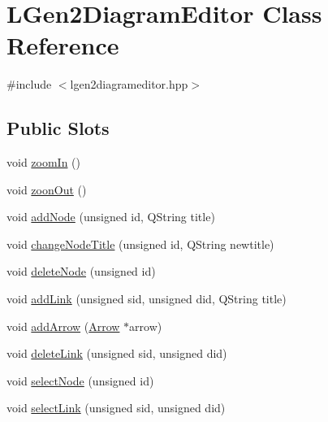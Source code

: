 \hypertarget{class_l_gen2_diagram_editor}{
\section{LGen2DiagramEditor Class Reference}
\label{class_l_gen2_diagram_editor}
}


{\ttfamily \#include $<$lgen2diagrameditor.hpp$>$}

\subsection*{Public Slots}
\begin{DoxyCompactItemize}
\item 
void \hyperlink{class_l_gen2_diagram_editor_a0cb72258dc04d666f512f7e30f778d9a}{zoomIn} ()
\item 
void \hyperlink{class_l_gen2_diagram_editor_ac9f21436ac48e8a3595397d341f16026}{zoonOut} ()
\item 
void \hyperlink{class_l_gen2_diagram_editor_af58ac4171cf79cf3096794900ddd0063}{addNode} (unsigned id, QString title)
\item 
void \hyperlink{class_l_gen2_diagram_editor_a53f263f0801c2a1041e40581efce9fb7}{changeNodeTitle} (unsigned id, QString newtitle)
\item 
void \hyperlink{class_l_gen2_diagram_editor_ab6bf36435bac8fb09a237784b9732367}{deleteNode} (unsigned id)
\item 
void \hyperlink{class_l_gen2_diagram_editor_a36cf04e3d98c867a74081938184235e3}{addLink} (unsigned sid, unsigned did, QString title)
\item 
void \hyperlink{class_l_gen2_diagram_editor_a51a56384a5d1c72d671bc2de08c0d7c2}{addArrow} (\hyperlink{class_arrow}{Arrow} $\ast$arrow)
\item 
void \hyperlink{class_l_gen2_diagram_editor_adcd63edb3724d01ea24366dadfcb29b7}{deleteLink} (unsigned sid, unsigned did)
\item 
void \hyperlink{class_l_gen2_diagram_editor_a3d5f0ab3dbb8911b3aaeef5604dd2ea0}{selectNode} (unsigned id)
\item 
void \hyperlink{class_l_gen2_diagram_editor_a8bc99ad6e584b1a690322470acd04250}{selectLink} (unsigned sid, unsigned did)
\end{DoxyCompactItemize}
